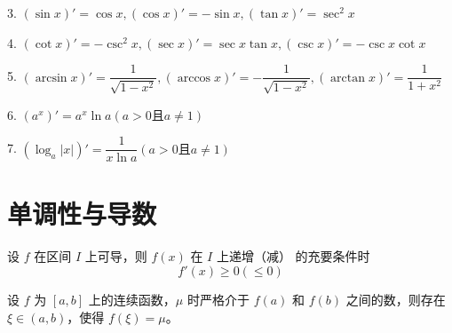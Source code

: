 3. $(\sin x)' = \cos x,(\cos x)'=-\sin x,(\tan x)'=\sec^2x$

4. $(\cot x)' = -\csc^2 x,(\sec x)'=\sec x \tan x,(\csc x)'=-\csc x \cot x$

5. $(\arcsin x)'=\dfrac{1}{\sqrt{1-x^2}},(\arccos x)' = -\dfrac{1}{\sqrt{1-x^2}},(\arctan x)'=\dfrac{1}{1+x^2}$

6. $(a^x)'=a^x \ln a(a>0\text{且}a\ne 1)$

7. $(\log_a|x|)'=\dfrac{1}{x\ln a}(a>0\text{且}a\ne 1)$

\section{单调性与导数}

\begin{theorem}
	设 $f$ 在区间 $I$ 上可导，则 $f(x)$ 在 $I$ 上递增（减） 的充要条件时
	$$f'(x) \geqslant 0(\leqslant 0)$$
\end{theorem}

\begin{theorem}[介值定理]
	设 $f$ 为 $[a,b]$ 上的连续函数，$\mu$ 时严格介于 $f(a)$ 和 $f(b)$ 之间的数，则存在 $\xi\in (a,b)$，使得 $f(\xi)=\mu$。
\end{theorem}